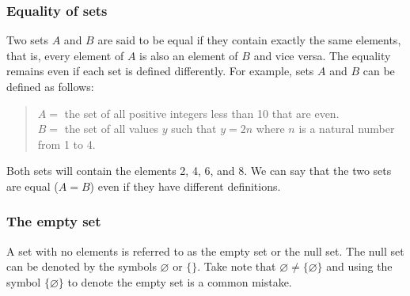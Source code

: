 \subsubsection{Equality of sets}
Two sets $A$ and $B$ are said to be equal if they contain exactly the same elements, that is, every element of $A$ is also an element of $B$ and vice versa. The equality remains even if each set is defined differently. For example, sets $A$ and $B$ can be defined as follows:
\begin{quote}
$A =$ the set of all positive integers less than 10 that are even.\\
$B =$ the set of all values $y$ such that $y=2n$ where $n$ is a natural number from 1 to 4.
\end{quote}

Both sets will contain the elements 2, 4, 6, and 8. We can say that the two sets are equal ($A=B$) even if they have different definitions.

\subsubsection{The empty set}
A set with no elements is referred to as the empty set or the null set. The null set can be denoted by the symbols $\varnothing$ or $\{\}$. Take note that $\varnothing\neq\{\varnothing\}$ and using the symbol $\{\varnothing\}$ to denote the empty set is a common mistake.

